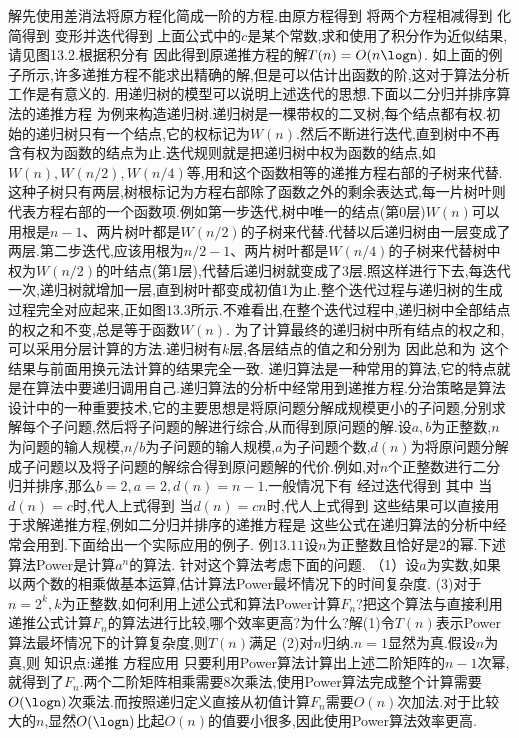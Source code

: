 解先使用差消法将原方程化简成一阶的方程.由原方程得到
将两个方程相减得到
化简得到
变形并迭代得到
上面公式中的$c$是某个常数,求和使用了积分作为近似结果,请见图13.2.根据积分有
因此得到原递推方程的解$T(n)=O(n\logn)$.
如上面的例子所示,许多递推方程不能求出精确的解,但是可以估计出函数的阶,这对于算法分析工作是有意义的.
用递归树的模型可以说明上述迭代的思想.下面以二分归并排序算法的递推方程
为例来构造递归树.递归树是一棵带权的二叉树,每个结点都有权.初始的递归树只有一个结点,它的权标记为$W(n)$.然后不断进行迭代,直到树中不再含有权为函数的结点为止.迭代规则就是把递归树中权为函数的结点,如$W(n),W(n/2),W(n/4)$等,用和这个函数相等的递推方程右部的子树来代替.这种子树只有两层,树根标记为方程右部除了函数之外的剩余表达式,每一片树叶则代表方程右部的一个函数项.例如第一步迭代,树中唯一的结点(第0层)$W(n)$可以用根是$n-1$、两片树叶都是$W(n/2)$的子树来代替.代替以后递归树由一层变成了两层.第二步迭代,应该用根为$n/2-1$、两片树叶都是$W(n/4)$的子树来代替树中权为$W(n/2)$的叶结点(第1层),代替后递归树就变成了3层.照这样进行下去,每迭代一次,递归树就增加一层,直到树叶都变成初值1为止.整个迭代过程与递归树的生成过程完全对应起来,正如图$13.3$所示.不难看出,在整个迭代过程中,递归树中全部结点的权之和不变,总是等于函数$W(n)$.
为了计算最终的递归树中所有结点的权之和,可以采用分层计算的方法.递归树有$k$层,各层结点的值之和分别为
因此总和为
这个结果与前面用换元法计算的结果完全一致.
递归算法是一种常用的算法,它的特点就是在算法中要递归调用自己.递归算法的分析中经常用到递推方程.分治策略是算法设计中的一种重要技术,它的主要思想是将原问题分解成规模更小的子问题,分别求解每个子问题,然后将子问题的解进行综合,从而得到原问题的解.设$a,b$为正整数,$n$为问题的输人规模,$n/b$为子问题的输人规模,$a$为子问题个数,$d(n)$为将原问题分解成子问题以及将子问题的解综合得到原问题解的代价.例如,对$n$个正整数进行二分归并排序,那么$b=2,a=2,d(n)=n-1$.一般情况下有
经过迭代得到
其中
当$d(n)=c$时,代人上式得到
当$d(n)=cn$时,代人上式得到
这些结果可以直接用于求解递推方程,例如二分归并排序的递推方程是
这些公式在递归算法的分析中经常会用到.下面给出一个实际应用的例子.
例$13.11$设$n$为正整数且恰好是2的幂.下述算法Power是计算$a^{n}$的算法.
针对这个算法考虑下面的问题.
（1）设$a$为实数,如果以两个数的相乘做基本运算,估计算法Power最坏情况下的时间复杂度.
(3)对于$n=2^{k},k$为正整数,如何利用上述公式和算法Power计算$F_{n}$?把这个算法与直接利用递推公式计算$F_{n}$的算法进行比较,哪个效率更高?为什么?解(1)令$T(n)$表示Power算法最坏情况下的计算复杂度,则$T(n)$满足
(2)对$n$归纳.$n=1$显然为真.假设$n$为真,则
知识点:递推
方程应用
只要利用Power算法计算出上述二阶矩阵的$n-1$次幂,就得到了$F_{n}$.两个二阶矩阵相乘需要8次乘法,使用Power算法完成整个计算需要$O(\logn)$次乘法.而按照递归定义直接从初值计算$F_{n}$需要$O(n)$次加法.对于比较大的$n$,显然$O(\logn)$比起$O(n)$的值要小很多,因此使用Power算法效率更高.
